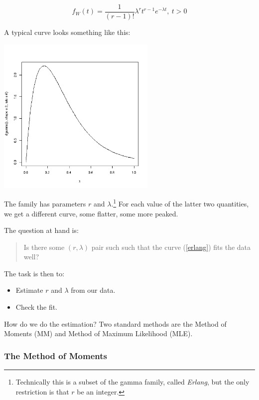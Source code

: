 \begin{equation}
\label{erlang}
f_{W}(t) = \frac{1}{(r-1)!} \lambda^r t^{r-1} e^{-\lambda t}, ~ t > 0
\end{equation}

A typical curve looks something like this:

\includegraphics[width=3.0in]{Images/ErlangShape2Rate6.png}

The family has parameters $r$ and $\lambda$.\footnote{Technically this
is a subset of the gamma family, called \textit{Erlang}, but the only
restriction is that $r$ be an integer.}  For each value of the latter
two quantities, we get a different curve, some flatter, some more
peaked.

The question at hand is:

\begin{quote}
Is there some $(r,\lambda)$ pair such such that the curve (\ref{erlang})
fits the data well?
\end{quote}

The task is then to:

\begin{itemize}

\item Estimate $r$ and $\lambda$ from our data.

\item Check the fit.

\end{itemize} 

How do we do the estimation?  Two standard methods are the Method of
Moments (MM) and Method of Maximum Likelihood (MLE).

\subsubsection{The Method of Moments}

